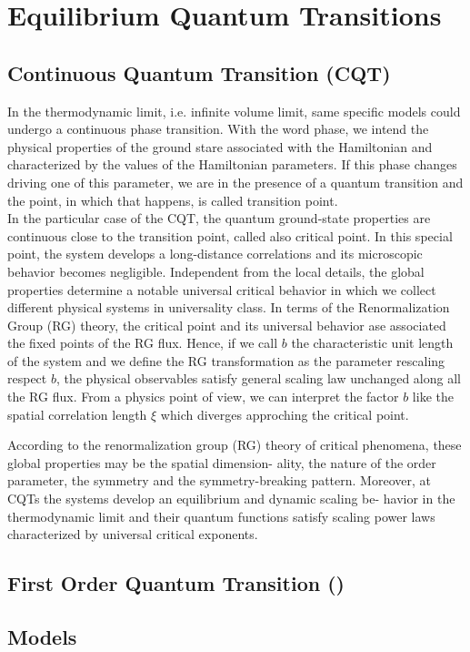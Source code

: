 \section{Equilibrium Quantum Transitions}

\subsection{Continuous Quantum Transition (CQT)}
In the thermodynamic limit, i.e. infinite volume limit, same specific models could undergo a continuous phase transition. With the word phase, we intend the physical properties of the ground stare associated with the Hamiltonian and characterized by the values of the Hamiltonian parameters. If this phase changes driving one of this parameter, we are in the presence of a quantum transition and the point, in which that happens, is called transition point.\\
In the particular case of the CQT, the quantum ground-state properties are continuous close to the transition point, called also critical point. 
In this special point, the system develops a long-distance correlations and its microscopic behavior becomes negligible. 
Independent from the local details, the global properties determine a notable universal critical behavior in which we collect different physical systems in universality class.
In terms of the Renormalization Group (RG) theory, the critical point and its universal behavior ase associated the fixed points of the RG flux. Hence, if we call $b$ the characteristic unit length of the system and we define the RG transformation as the parameter rescaling respect $b$, the physical observables satisfy general scaling law unchanged along all the RG flux.
From a physics point of view, we can interpret the factor $b$ like the spatial correlation length $\xi$ which diverges approching the critical point.

 According to the renormalization group (RG)
theory of critical phenomena, these global properties may be the spatial dimension-
ality, the nature of the order parameter, the symmetry and the symmetry-breaking
pattern.
Moreover, at CQTs the systems develop an equilibrium and dynamic scaling be-
havior in the thermodynamic limit and their quantum functions satisfy scaling
power laws characterized by universal critical exponents.

\subsection{First Order Quantum Transition ()}


\subsection{Models}


